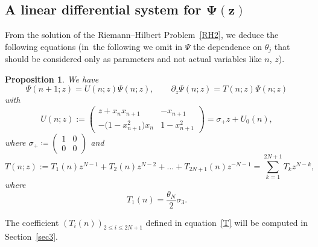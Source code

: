 \documentclass[pdftex]{sigma}%
\numberwithin{equation}{section}
\newtheorem{Proposition}[Theorem]{Proposition}
 { \theoremstyle{definition}
\newtheorem{Definition}[Theorem]{Definition}
\newtheorem{Note}[Theorem]{Note}
\newtheorem{Example}[Theorem]{Example}
\newtheorem{problem}[Theorem]{Riemann--Hilbert Problem}
\newtheorem{Remark}[Theorem]{Remark} }
\begin{document}
\subsection[A linear differential system for Psi(z)]{A linear differential system for $\boldsymbol{\Psi(z)}$}
	From the solution of the Riemann--Hilbert Problem~\ref{RH2}, we deduce the following equations (in~the following we omit in $\Psi$ the dependence on $\theta_j$ that should be considered only as parameters and not actual variables like $n$, $z$).
	\begin{Proposition}
	\label{Prop:LaxPair} We have
		\begin{equation}
			\Psi(n+1;z)=U(n;z)\Psi(n;z),\qquad
			\partial_z\Psi(n;z)=T(n;z)\Psi(n;z)
			\label{Lax_pair}
		\end{equation}
		with
		\begin{equation}	\label{U}
			U(n;z):=\begin{pmatrix}
				z+x_nx_{n+1}&-x_{n+1}\\[1mm]
				-\big(1-x_{n+1}^2\big)x_n&1-x_{n+1}^2
			\end{pmatrix}=\sigma_+z+U_0(n),
		\end{equation}
		where $\sigma_+\coloneqq\begin{pmatrix}
				1& 0\\
				0&0
			\end{pmatrix}$ and
		\begin{equation}
			T(n;z):=T_1(n)z^{N-1}+T_2(n)z^{N-2}+\dots+T_{2N+1}(n)z^{-N-1} = \sum_{k=1}^{2N+1}T_kz^{N-k},
			\label{T}
		\end{equation}
		where
		\begin{equation}\label{eq: T1}
			T_1(n)=\frac{\theta_N}{2}\sigma_3.
		\end{equation}
	\end{Proposition}

	\begin{Remark}
	The coefficient $(T_i(n))_{2\leqslant i \leqslant 2N+1}$ defined in equation~\eqref{T} will be computed in Section~\ref{sec3}.
	\end{Remark}
\end{document}
